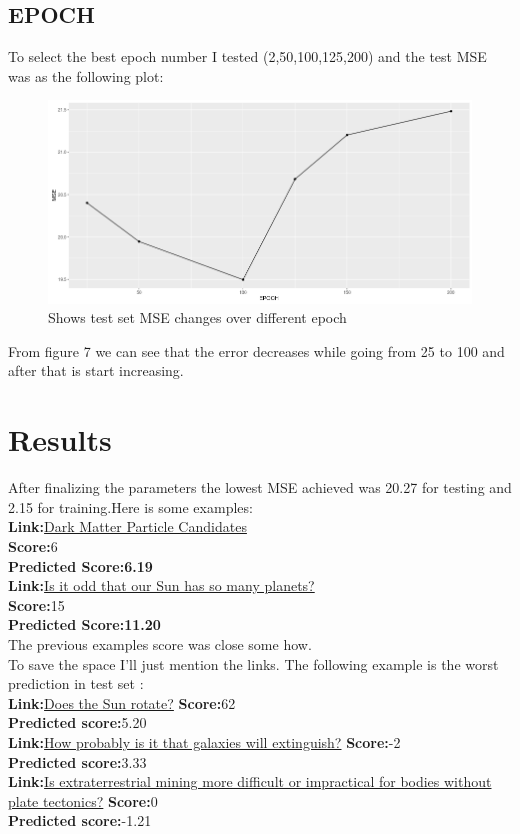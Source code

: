 \documentclass{article}
\begin{document}
\begin{multicols*}{2}
\begin{flushleft}
\subsection{EPOCH}
To select the best epoch number I tested (2,50,100,125,200) and the test MSE was as the following plot:
\begin{figure}[H]
\includegraphics[scale=0.27]{EPOCH.png}
\caption{Shows test set MSE changes over different epoch}
\end{figure}
From figure 7 we can see that the error decreases while going from 25 to 100 and after that is start increasing.
\section{Results}
After finalizing the parameters the lowest MSE achieved was 20.27 for testing and 2.15 for training.Here is some examples:\\
\textbf{Link:}\href{http://astronomy.stackexchange.com/questions/322}{Dark Matter Particle Candidates}\\
\textbf{Score:}6\\
\textbf{Predicted Score:6.19}\\
\textbf{Link:}\href{http://astronomy.stackexchange.com/questions/13301}{Is it odd that our Sun has so many planets?}\\
\textbf{Score:}15\\
\textbf{Predicted Score:11.20}\\
The previous examples score was close some how.\\
To save the space I'll just mention the links.
The following example is the worst prediction in test set :\\
\textbf{Link:}\href{http://astronomy.stackexchange.com/questions/140}{Does the Sun rotate?}
\textbf{Score:}62\\
\textbf{Predicted score:}5.20\\
\textbf{Link:}\href{http://astronomy.stackexchange.com/questions/13559}{How probably is it that galaxies will extinguish?}
\textbf{Score:}-2\\
\textbf{Predicted score:}3.33\\
\textbf{Link:}\href{http://astronomy.stackexchange.com/questions/12385}{Is extraterrestrial mining more difficult or impractical for bodies without plate tectonics?}
\textbf{Score:}0\\
\textbf{Predicted score:}-1.21\\


\end{flushleft}
\end{multicols*}
\end{document}
